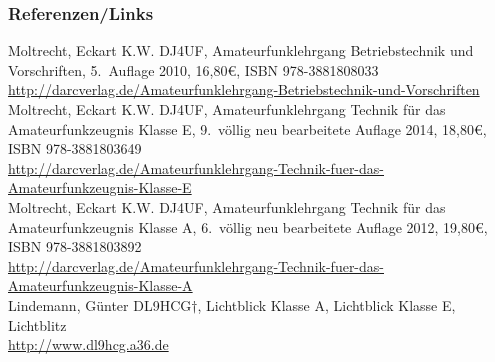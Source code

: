 
%


\begin{frame}
    \frametitle{Referenzen/Links}
    \hypertarget{refs}{}
    \footnotesize

    \begin{thebibliography}{}
            Moltrecht, Eckart K.W. DJ4UF, Amateurfunklehrgang Betriebstechnik und Vorschriften, 5.~Auflage 2010, 16,80€, ISBN 978-3881808033 \\
                        \url{http://darcverlag.de/Amateurfunklehrgang-Betriebstechnik-und-Vorschriften}
           Moltrecht, Eckart K.W. DJ4UF, Amateurfunklehrgang Technik für das Amateurfunkzeugnis Klasse E, 9.~völlig neu bearbeitete Auflage 2014, 18,80€, ISBN 978-3881803649 \\
                        \url{http://darcverlag.de/Amateurfunklehrgang-Technik-fuer-das-Amateurfunkzeugnis-Klasse-E} \\
           Moltrecht, Eckart K.W. DJ4UF, Amateurfunklehrgang Technik für das Amateurfunkzeugnis Klasse A, 6.~völlig neu bearbeitete Auflage 2012, 19,80€, ISBN 978-3881803892 \\
                        \url{http://darcverlag.de/Amateurfunklehrgang-Technik-fuer-das-Amateurfunkzeugnis-Klasse-A}\\
        	Lindemann, Günter DL9HCG$\dagger$, Lichtblick Klasse A, Lichtblick Klasse E, Lichtblitz \\
          \url{http://www.dl9hcg.a36.de}
    \end{thebibliography}

\end{frame}


